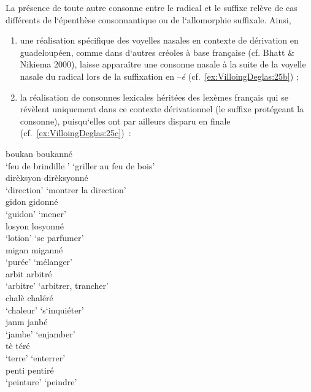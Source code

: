 \documentclass[output=paper]{langsci/langscibook}
\begin{document}
La présence de toute autre consonne entre le radical et le suffixe
relève de cas différents de l`épenthèse consonnantique ou de
l`allomorphie suffixale. Ainsi,

\begin{enumerate}[label=(\roman*)]
\item une réalisation spécifique des voyelles nasales en contexte de
dérivation en guadeloupéen, comme dans d`autres créoles à base française
(cf. Bhatt \& Nikiema 2000), laisse apparaître une consonne nasale à la
suite de la voyelle nasale du radical lors de la suffixation en
--\emph{é} (cf.~\ref{ex:VilloingDeglas:25b}) ;

\item la réalisation de consonnes lexicales héritées des lexèmes français
qui se révèlent uniquement dans ce contexte dérivationnel (le suffixe
protégeant la consonne), puisqu`elles ont par ailleurs disparu en finale
(cf.~\ref{ex:VilloingDeglas:25c})~:

\end{enumerate}


\ea \label{ex:VilloingDeglas:25b}
  \ea \gll boukan \textrightarrow{} boukanné\\
  {`feu de brindille '} {} {`griller au feu de bois'}\\
  \ex \gll dirèksyon \textrightarrow{} dirèksyonné\\
  {`direction'} {} {`montrer la direction'}\\
  \ex \gll gidon \textrightarrow{} gidonné\\
  {`guidon'} {} {`mener'}\\
  \ex \gll losyon \textrightarrow{} losyonné\\
  `lotion' {} {`se parfumer'}\\
  \ex \gll migan \textrightarrow{} miganné\\
  {`purée'} {} {`mélanger'}\\
  \z
\ex \label{ex:VilloingDeglas:25c}
  \ea \gll arbit \textrightarrow{} arbitré\\
  `arbitre' {} {`arbitrer, trancher'}\\
  \ex \gll chalè \textrightarrow{} chaléré\\
  {`chaleur'} {} {`s`inquiéter'}\\
  \ex \gll janm \textrightarrow{} janbé\\
  {`jambe'} {} {`enjamber'}\\
  \ex \gll tè \textrightarrow{} téré\\
  {`terre'} {} {`enterrer'}\\
  \ex \gll penti \textrightarrow{} pentiré\\
  {`peinture'} {} {`peindre'}\\
\z
\z
\end{document}
